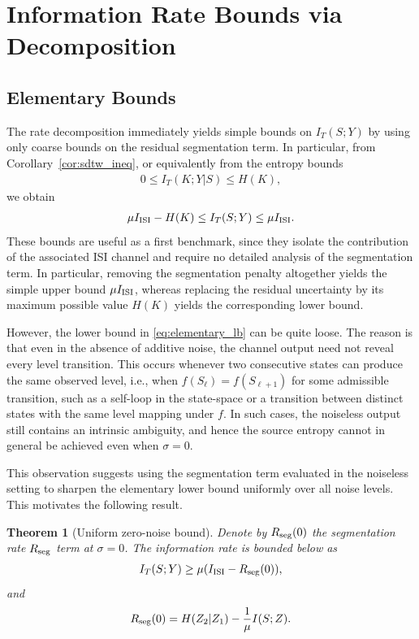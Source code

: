 \documentclass[onecolumn]{IEEEtran}
\newtheorem{theorem}{Theorem}
\theoremstyle{definition}
\begin{document}
\section{Information Rate Bounds via Decomposition}\label{sec:bounds}

\subsection{Elementary Bounds}

The rate decomposition immediately yields simple bounds on $I_T(S;Y)$ by using only coarse bounds on the residual segmentation term. In particular, from Corollary~\ref{cor:sdtw_ineq}, or equivalently from the entropy bounds
\begin{align*}
    0 \le I_T(K;Y|S) \le H(K),
\end{align*}
we obtain
\begin{align}\label{eq:elementary_lb}
    \mu I_{\rm ISI}-H(K) \le I_T(S;Y) \le \mu I_{\rm ISI}.
\end{align}
These bounds are useful as a first benchmark, since they isolate the contribution of the associated ISI channel and require no detailed analysis of the segmentation term. In particular, removing the segmentation penalty altogether yields the simple upper bound $\mu I_{\rm ISI}$, whereas replacing the residual uncertainty by its maximum possible value $H(K)$ yields the corresponding lower bound.

However, the lower bound in \eqref{eq:elementary_lb} can be quite loose. The reason is that even in the absence of additive noise, the channel output need not reveal every level transition. This occurs whenever two consecutive states can produce the same observed level, i.e., when $f(S_\ell)=f(S_{\ell+1})$ for some admissible transition, such as a self-loop in the state-space or a transition between distinct states with the same level mapping under $f$. In such cases, the noiseless output still contains an intrinsic ambiguity, and hence the source entropy cannot in general be achieved even when $\sigma=0$.

This observation suggests using the segmentation term evaluated in the noiseless setting to sharpen the elementary lower bound uniformly over all noise levels. This motivates the following result. 

\begin{theorem}[Uniform zero-noise bound]
\label{thm:uniform_zero_noise_lower_bound}
Denote by $R_{\rm seg}(0)$ the segmentation rate $R_{\rm seg}$ term at $\sigma=0$. The information rate is bounded below as
\begin{align}
    I_T(S;Y) \ge \mu(I_{\rm ISI}-R_{\rm seg}(0)),
\end{align}
and
\begin{align}
    R_{\rm seg}(0)
    = H(Z_2|Z_1)-\frac{1}{\mu}I(S;Z).
    \label{eq:Rseg0}
\end{align}
\end{theorem}
\end{document}
